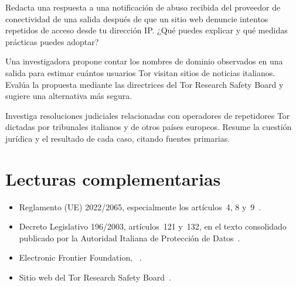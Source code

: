 \begin{esercizio}[2]\label{es:25-segnalazione}
Redacta una respuesta a una notificación de abuso recibida del proveedor de conectividad de una salida después de que un sitio web denuncie intentos repetidos de acceso desde tu dirección IP. ¿Qué puedes explicar y qué medidas prácticas puedes adoptar?
\end{esercizio}

\begin{esercizio}[2]\label{es:25-esperimento}
Una investigadora propone contar los nombres de dominio observados en una salida para estimar cuántos usuarios Tor visitan sitios de noticias italianos. Evalúa la propuesta mediante las directrices del Tor Research Safety Board y sugiere una alternativa más segura.
\end{esercizio}

\begin{esercizio}[3]\label{es:25-ricerca}
Investiga resoluciones judiciales relacionadas con operadores de repetidores Tor dictadas por tribunales italianos y de otros países europeos. Resume la cuestión jurídica y el resultado de cada caso, citando fuentes primarias.
\end{esercizio}

\section*{Lecturas complementarias}
\begin{itemize}
  \item Reglamento (UE) 2022/2065, especialmente los artículos~4, 8 y~9~\cite{dsa2022}.
  \item Decreto Legislativo 196/2003, artículos~121 y~132, en el texto consolidado publicado por la Autoridad Italiana de Protección de Datos~\cite{codiceprivacy}.
  \item Electronic Frontier Foundation, ~\cite{efflegalfaq}.
  \item Sitio web del Tor Research Safety Board~\cite{trsb}.
\end{itemize}
